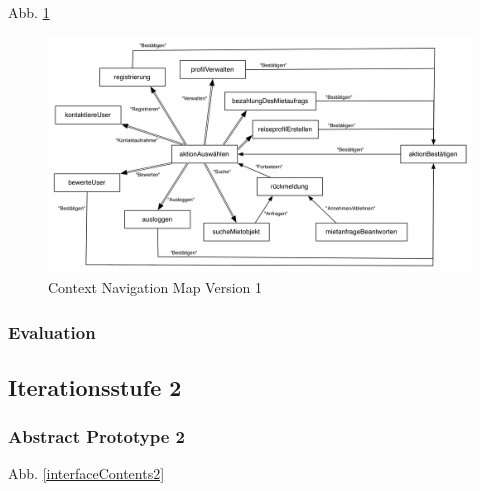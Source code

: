 Abb. \ref{fig:navigationmap1}
\begin{figure}[H]
\includegraphics[width=1\textwidth]{./images/navigationmap1.png}
\caption{Context Navigation Map Version 1}
\label{fig:navigationmap1}
\end{figure}


\newpage
\subsubsection{Evaluation}

\subsection{Iterationsstufe 2}
\subsubsection{Abstract Prototype 2}


Abb. \ref{interfaceContents2}

